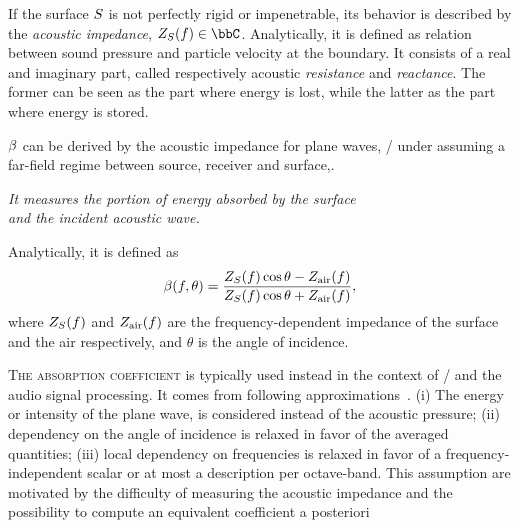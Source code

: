 If the surface $S$ is not perfectly rigid or impenetrable, its behavior is described by the \textit{acoustic impedance}, $\impedence_\surface(f) \in \bbC$.
Analytically, it is defined as relation between sound pressure and particle velocity at the boundary.
It consists of a real and imaginary part, called respectively acoustic \textit{resistance} and \textit{reactance}.
The former can be seen as the part where energy is lost, while the latter as the part where energy is stored.

 $\beta$ can be derived by the acoustic impedance
for plane waves, \ie/ under assuming a far-field regime between source, receiver and surface,.
\begin{center}
    \textit{It measures the portion of energy absorbed by the surface
    \\and the incident acoustic wave.}
\end{center}
Analytically, it is defined as  \cite{kuttruff2016room,pierce2019acoustics}
\begin{equation}
    \beta(f, \theta) = \frac{Z_{S}(f)\cos{\theta} - Z_\text{air}(f)}{Z_{S}(f)\cos{\theta} + Z_\text{air}(f)}
    ,
\end{equation}
where $Z_{S}(f)$ and $Z_\text{air}(f)$ are the frequency-dependent impedance of the surface and the air respectively,
and $\theta$ is the angle of incidence.

\textsc{The absorption coefficient} is typically used instead in the context of \GA/ and the audio signal processing.
It comes from following approximations~.
(i) The energy or intensity of the plane wave, is considered instead of the acoustic pressure;
(ii) dependency on the angle of incidence is relaxed in favor of the averaged quantities;
(iii) local dependency on frequencies is relaxed in favor of a frequency-independent scalar or at most a description per octave-band.
This assumption are motivated by the difficulty of measuring the acoustic impedance
and the possibility to compute an equivalent coefficient a posteriori

